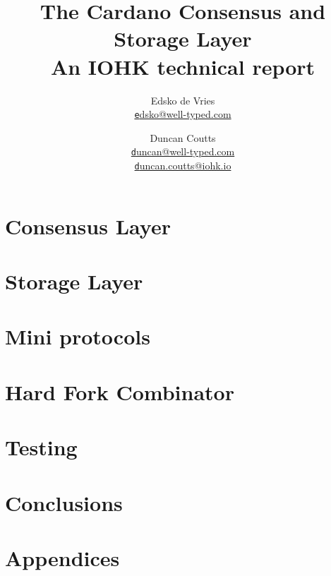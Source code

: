 \documentclass[11pt,a4paper]{report}
\title{The Cardano Consensus and Storage Layer \\
       {\large \sc An IOHK technical report}
  }
\author{Edsko de Vries \\ \href{mailto:edsko@well-typed.com}
                               {\small \texttt edsko@well-typed.com}
   \and Duncan Coutts  \\ \href{mailto:duncan@well-typed.com}
                               {\small \texttt duncan@well-typed.com}
                       \\ \href{mailto:duncan.coutts@iohk.io}
                               {\small \texttt duncan.coutts@iohk.io}
  }
\theoremstyle{definition}
\numberwithin{property}{chapter}
\numberwithin{definition}{chapter}
\numberwithin{lemma}{chapter}
\numberwithin{assumption}{chapter}
\numberwithin{corollary}{chapter}
\begin{document}
\maketitle

\tableofcontents





\part{Consensus Layer}





\part{Storage Layer}









\part{Mini protocols}




\part{Hard Fork Combinator}





\part{Testing}




\part{Conclusions}





\part{Appendices}
\appendix






\end{document}
